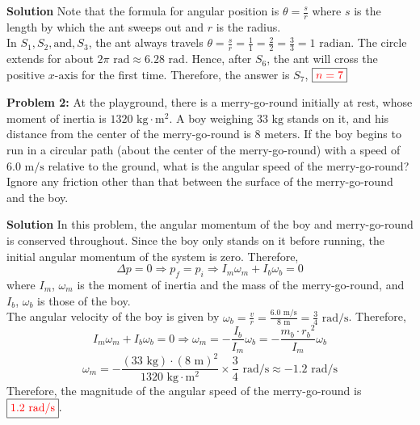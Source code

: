 \documentclass[12pt]{article}
\begin{document}
	\begin{mybox}{\textbf{Solution}}
		Note that the formula for angular position is \( \displaystyle{\theta = \frac{s}{r}} \) where $s$ is the length by which the ant sweeps out and $r$ is the radius. \\
		
		In $S_1, S_2, \text{and}, S_3$, the ant always travels \( \theta = \displaystyle{\frac{s}{r}} = \frac{1}{1} = \frac{2}{2} = \frac{3}{3} = 1\text{ radian} \). The circle extends for about $2\pi\text{ rad} \approx 6.28\text{ rad}$. Hence, after $S_6$, the ant will cross the positive $x\text{-axis}$ for the first time. Therefore, the answer is $S_7$, $\boxed{\textcolor{red}{n=7}}$
	\end{mybox}

	\bigskip
	
	\noindent \textbf{Problem 2:} At the playground, there is a merry-go-round initially at rest, whose moment of inertia is $1320\text{ kg} \cdot \text{m}^2$. A boy weighing $33\text{ kg}$ stands on it, and his distance from the center of the merry-go-round is $8\text{ meters}$. If the boy begins to run in a circular path (about the center of the merry-go-round) with a speed of $6.0\text{ m/s}$ relative to the ground, what is the angular speed of the merry-go-round? \\
	
	\noindent Ignore any friction other than that between the surface of the merry-go-round and the boy. \\
	
	\begin{mybox}{\textbf{Solution}}
		In this problem, the angular momentum of the boy and merry-go-round is conserved throughout. Since the boy only stands on it before running, the initial angular momentum of the system is zero. Therefore, 
		\[ \Delta p = 0 \Rightarrow  p_f = p_i \Rightarrow I_m\omega_m + I_b\omega_b = 0 \]
		where $I_m$, $\omega_m$ is the moment of inertia and the mass of the merry-go-round, and $I_b$, $\omega_b$ is those of the boy.\\
		
		The angular velocity of the boy is given by $\displaystyle{\omega_b = \frac{v}{r} = \frac{6.0\text{ m/s}}{8\text{ m}} = \frac{3}{4}\text{ rad/s}} $. Therefore,
		\[
			I_m\omega_m + I_b\omega_b = 0 \Rightarrow \omega_m = -\frac{I_b}{I_m} \omega_b = - \frac{m_b\cdot{r_b}^2}{I_m}\omega_b
		\]
		\[
			\omega_m = - \frac{ (33\text{ kg})\cdot (8\text{ m})^2 }{1320\text{ kg} \cdot \text{m}^2} \times \frac{3}{4}\text{ rad/s} \approx -1.2\text{ rad/s} 
		\]  
		\noindent Therefore, the magnitude of the angular speed of the merry-go-round is $\boxed{\textcolor{red}{1.2\text{ rad/s}}}.$
	\end{mybox}
\end{document}
